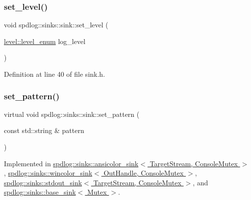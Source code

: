 \subsubsection{\texorpdfstring{set\+\_\+level()}{set\_level()}}
{\footnotesize\ttfamily void spdlog\+::sinks\+::sink\+::set\+\_\+level (\begin{DoxyParamCaption}\item[{\hyperlink{namespacespdlog_1_1level_a35f5227e5daf228d28a207b7b2aefc8b}{level\+::level\+\_\+enum}}]{log\+\_\+level }\end{DoxyParamCaption})\hspace{0.3cm}{\ttfamily [inline]}}



Definition at line 40 of file sink.\+h.

\mbox{\label{classspdlog_1_1sinks_1_1sink_a7e5cfd4b683c8bfa8fbd602d7f409632}} 
\subsubsection{\texorpdfstring{set\+\_\+pattern()}{set\_pattern()}}
{\footnotesize\ttfamily virtual void spdlog\+::sinks\+::sink\+::set\+\_\+pattern (\begin{DoxyParamCaption}\item[{const std\+::string \&}]{pattern }\end{DoxyParamCaption})\hspace{0.3cm}{\ttfamily [pure virtual]}}



Implemented in \hyperlink{classspdlog_1_1sinks_1_1ansicolor__sink_ab84f8a9299e060e55dcfbe333806aedc}{spdlog\+::sinks\+::ansicolor\+\_\+sink$<$ Target\+Stream, Console\+Mutex $>$}, \hyperlink{classspdlog_1_1sinks_1_1wincolor__sink_a5032da6fc760507134a7d1eff1a20b0a}{spdlog\+::sinks\+::wincolor\+\_\+sink$<$ Out\+Handle, Console\+Mutex $>$}, \hyperlink{classspdlog_1_1sinks_1_1stdout__sink_a5b8759dab80ca44e9d185e21aa797d2a}{spdlog\+::sinks\+::stdout\+\_\+sink$<$ Target\+Stream, Console\+Mutex $>$}, and \hyperlink{classspdlog_1_1sinks_1_1base__sink_a2b0a0b95f1e7272b443de67b46914152}{spdlog\+::sinks\+::base\+\_\+sink$<$ Mutex $>$}.


